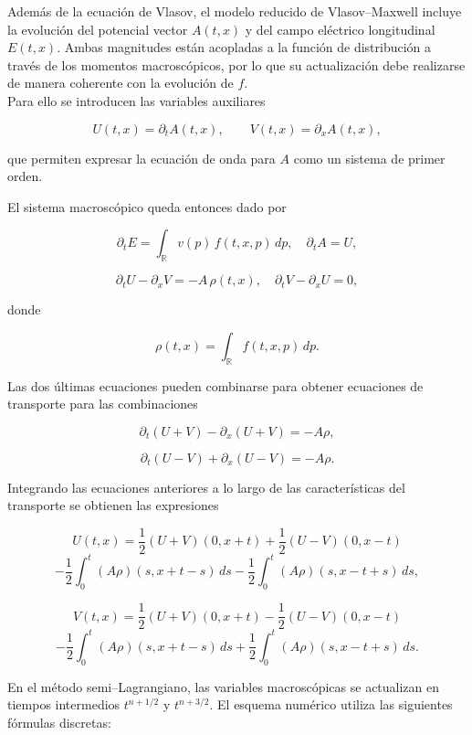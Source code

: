 \documentclass[11pt,a4paper,twoside,pdf]{article}
\numberwithin{equation}{section}
\begin{document}
Además de la ecuación de Vlasov, el modelo reducido de Vlasov--Maxwell incluye la
evolución del potencial vector $A(t,x)$ y del campo eléctrico longitudinal $E(t,x)$.
Ambas magnitudes están acopladas a la función de distribución a través de los
momentos macroscópicos, por lo que su actualización debe realizarse de manera
coherente con la evolución de $f$. \\

Para ello se introducen las variables auxiliares


\[
U(t,x)=\partial_t A(t,x), \qquad V(t,x)=\partial_x A(t,x),
\]


que permiten expresar la ecuación de onda para $A$ como un sistema de primer
orden.

El sistema macroscópico queda entonces dado por


\[
\partial_t E = \int_{\mathbb{R}} v(p)\,f(t,x,p)\,dp, \quad \partial_t A = U,
\]




\[
\partial_t U - \partial_x V = -A\,\rho(t,x), \quad
\partial_t V - \partial_x U = 0,
\]


donde


\[
\rho(t,x)=\int_{\mathbb{R}} f(t,x,p)\,dp.
\]



Las dos últimas ecuaciones pueden combinarse para obtener ecuaciones de transporte
para las combinaciones




\[
\partial_t(U+V) - \partial_x(U+V) = -A\rho,
\]




\[
\partial_t(U-V) + \partial_x(U-V) = -A\rho.
\]




Integrando las ecuaciones anteriores a lo largo de las características del transporte se
obtienen las expresiones


\[
U(t,x) = \frac{1}{2}(U+V)(0,x+t) + \frac{1}{2}(U-V)(0,x-t)
\]
\[
- \frac{1}{2}\int_0^t (A\rho)(s,x+t-s)\,ds
- \frac{1}{2}\int_0^t (A\rho)(s,x-t+s)\,ds,
\]




\[
V(t,x) = \frac{1}{2}(U+V)(0,x+t) - \frac{1}{2}(U-V)(0,x-t)
\]
\[
- \frac{1}{2}\int_0^t (A\rho)(s,x+t-s)\,ds
+ \frac{1}{2}\int_0^t (A\rho)(s,x-t+s)\,ds.
\]





En el método semi--Lagrangiano, las variables macroscópicas se actualizan en tiempos
intermedios $t^{n+1/2}$ y $t^{n+3/2}$. El esquema numérico utiliza las siguientes
fórmulas discretas:
\end{document}
